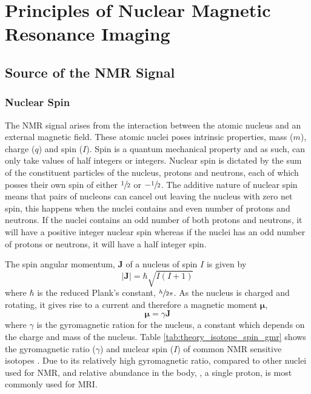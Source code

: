 \chapter{Principles of Nuclear Magnetic Resonance Imaging}
\label{chap:Theory}

\begin{abstract}
	\lipsum[1]
\end{abstract}
\newpage

\section{Source of the NMR Signal}
\label{sec:theory_source_of_nmr}

\subsection{Nuclear Spin}
\label{subsec:theory_nuclear_spin}
The \ac{NMR} signal arises from the interaction between the atomic nucleus and an external magnetic field. These atomic nuclei poses intrinsic properties, mass ($m$), charge ($q$) and spin ($I$). Spin is a quantum mechanical property and as such, can only take values of half integers or integers. Nuclear spin is dictated by the sum of the constituent particles of the nucleus, protons and neutrons, each of which posses their own spin of either $\sfrac{1}{2}$ or $-\sfrac{1}{2}$. The additive nature of nuclear spin means that pairs of nucleons can cancel out leaving the nucleus with zero net spin, this happens when the nuclei contains and even number of protons and neutrons. If the nuclei contains an odd number of both protons and neutrons, it will have a positive integer nuclear spin whereas if the nuclei has an odd number of protons or neutrons, it will have a half integer spin. 


The spin angular momentum, $\mathbf{J}$ of a nucleus of spin $I$ is given by
\begin{equation}
\left|\mathbf{J}\right| = \hbar \sqrt{I\left(I+1\right)}
\label{eq:theory_angular_momentum}
\end{equation}
where $\hbar$ is the reduced Plank's constant, $\sfrac{h}{2\pi}$. As the nucleus is charged and rotating, it gives rise to a current and therefore a magnetic moment $\mathbf{\mu}$,
\begin{equation}
\mathbf{\mu}=\gamma \mathbf{J}
\label{eq:theory_magnetic_moment}
\end{equation}
where $\gamma$ is the gyromagnetic ration for the nucleus, a constant which depends on the charge and mass of the nucleus. Table \ref{tab:theory_isotope_spin_gmr} shows the gyromagnetic ratio ($\gamma$) and nuclear spin ($I$) of common \ac{NMR} sensitive isotopes \cite{harris_nmr_1976, bernstein_handbook_2004, westbrook_mri_2015}. Due to its relatively high gyromagnetic ratio, compared to other nuclei used for \ac{NMR}, and relative abundance in the body, , a single proton, is most commonly used for \ac{MRI}.

